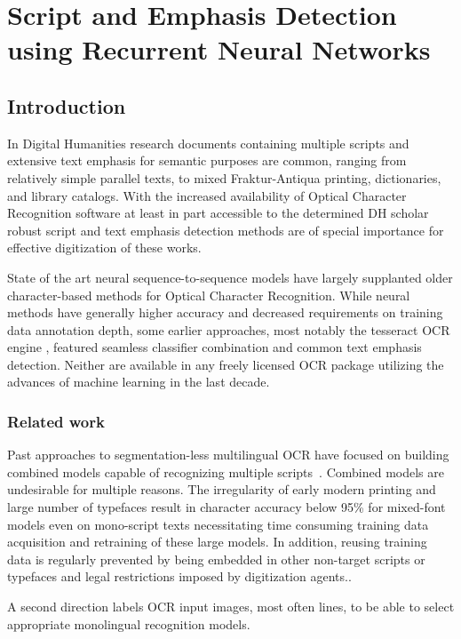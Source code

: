 \chapter{Script and Emphasis Detection using Recurrent Neural Networks}

\section{Introduction}

In Digital Humanities research documents containing multiple scripts and
extensive text emphasis for semantic purposes are common, ranging from
relatively simple parallel texts, to mixed Fraktur-Antiqua printing,
dictionaries, and library catalogs. With the increased availability of Optical
Character Recognition software at least in part accessible to the determined DH
scholar robust script and text emphasis detection methods are of special
importance for effective digitization of these works.

State of the art neural sequence-to-sequence models have largely supplanted
older character-based methods for Optical Character Recognition. While neural
methods have generally higher accuracy and decreased requirements on training
data annotation depth, some earlier approaches, most notably the tesseract OCR
engine \cite{smith2009adapting}, featured seamless classifier combination and
common text emphasis detection. Neither are available in any freely licensed
OCR package utilizing the advances of machine learning in the last decade.

\subsection{Related work}

Past approaches to segmentation-less multilingual OCR have focused on building
combined models capable of recognizing multiple scripts~\cite{ul2013can}.
Combined models are undesirable for multiple reasons. The irregularity of early
modern printing and large number of typefaces result in character accuracy
below 95\% for mixed-font models even on mono-script texts
\cite{springmann2016automatic} necessitating time consuming training data
acquisition and retraining of these large models. In addition, reusing training
data is regularly prevented by being embedded in other non-target scripts or
typefaces and legal restrictions imposed by digitization agents..

A second direction labels OCR input images, most often lines, to be able to
select appropriate monolingual recognition models. 

